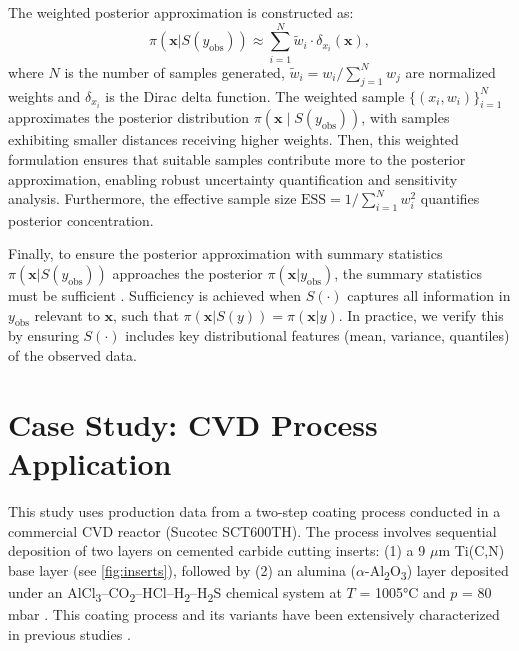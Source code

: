 \documentclass{article}
\newcommand\alumina{$\alpha$-Al\textsubscript{2}O\textsubscript{3}}
\begin{document}
		
	The weighted posterior approximation is constructed as:
	$$\pi(\bm{x}|S(y_\text{obs})) \approx \sum_{i=1}^{N} \tilde{w}_i \cdot \delta_{x_i}(\bm{x}),$$
	where $N$ is the number of samples generated, $\tilde{w}_i = w_i / \sum_{j=1}^{N} w_j$ are normalized weights and $\delta_{x_i}$ is the Dirac delta function. The weighted sample $\displaystyle \{(x_i, w_i)\}_{i=1}^N$ approximates the posterior distribution $\pi(\bm{x} \mid S(y_\text{obs}))$, with samples exhibiting smaller distances receiving higher weights. Then, this weighted formulation ensures that suitable samples contribute more to the posterior approximation, enabling robust uncertainty quantification and sensitivity analysis. Furthermore, the effective sample size $\text{ESS} = 1/\sum_{i=1}^N w_i^2$ quantifies posterior concentration. 
		
	Finally, to ensure the posterior approximation with summary statistics $\pi(\bm{x}|S(y_\text{obs}))$ approaches the posterior $\pi(\bm{x}|y_\text{obs})$, the summary statistics must be sufficient \cite{Beaumont2002,10.121412STS406}. Sufficiency is achieved when $S(\cdot)$ captures all information in $y_\text{obs}$ relevant to $\bm{x}$, such that $\pi(\bm{x}|S(y)) = \pi(\bm{x}|y)$. In practice, we verify this by ensuring $S(\cdot)$ includes key distributional features (mean, variance, quantiles) of the observed data.
		
		
		
\section{Case Study: CVD Process Application}\label{sec:Process}
		
	This study uses production data from a two-step coating process conducted in a commercial CVD reactor (Sucotec SCT600TH). The process involves sequential deposition of two layers on cemented carbide cutting inserts: (1) a 9 $\mu$m Ti(C,N) base layer (see \cref{fig:inserts}), followed by (2) an alumina (\alumina{}) layer deposited under an AlCl\textsubscript{3}–CO\textsubscript{2}–HCl–H\textsubscript{2}–H\textsubscript{2}S chemical system at $T$ = 1005°C and $p$ = 80 mbar \citep{hochauerCarbonDopedAAl2O32012}. This coating process and its variants have been extensively characterized in previous studies \cite{papavasileiou2024integrating, papavasileiou2022efficient, papavasileiouEquationbasedDatadrivenModeling2023}. 
		
\end{document}
